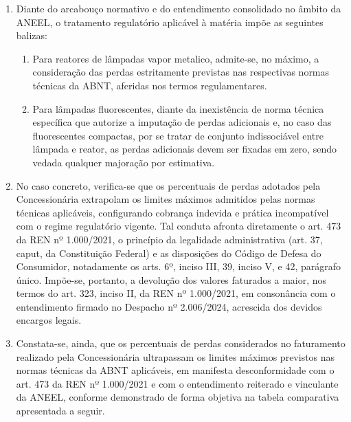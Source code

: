 \begin{enumerate}[resume]
{(iii) determinar que esta decisão seja cumprida no prazo de 15 (quinze) dias após o seu trânsito em julgado; e  

(iv) determinar que a distribuidora envie à ANEEL, num prazo máximo de 15 (quinze) dias após o prazo previsto no item

(viii) desta decisão, comprovação do seu cumprimento. (grifou-se)}

\item
Diante do arcabouço normativo e do entendimento consolidado no âmbito da ANEEL, o tratamento regulatório aplicável à matéria impõe as seguintes balizas: 

\begin{enumerate}
    \ifperdaVapor
    \item %
    Para reatores de lâmpadas vapor metalico, admite-se, no máximo, a consideração das perdas estritamente previstas nas respectivas normas técnicas da ABNT, aferidas nos termos regulamentares.
    \fi
    \ifperdaFluorescente
    \item %
    Para lâmpadas fluorescentes, diante da inexistência de norma técnica específica que autorize a imputação de perdas adicionais  e, no caso das fluorescentes compactas, por se tratar de conjunto indissociável entre lâmpada e reator, as perdas adicionais devem ser fixadas em zero, sendo vedada qualquer majoração por estimativa.
    \fi
\end{enumerate}

\ifperdaVapor
\item %
No caso concreto, verifica-se que os percentuais de perdas adotados pela Concessionária extrapolam os limites máximos admitidos pelas normas técnicas aplicáveis, configurando cobrança indevida e prática incompatível com o regime regulatório vigente. Tal conduta afronta diretamente o art. 473 da REN nº 1.000/2021, o princípio da legalidade administrativa (art. 37, caput, da Constituição Federal) e as disposições do Código de Defesa do Consumidor, notadamente os arts. 6º, inciso III, 39, inciso V, e 42, parágrafo único. Impõe-se, portanto, a devolução dos valores faturados a maior, nos termos do art. 323, inciso II, da REN nº 1.000/2021, em consonância com o entendimento firmado no Despacho nº 2.006/2024, acrescida dos devidos encargos legais. 

\item %
Constata-se, ainda, que os percentuais de perdas considerados no faturamento realizado pela Concessionária ultrapassam os limites máximos previstos nas normas técnicas da ABNT aplicáveis, em manifesta desconformidade com o art. 473 da REN nº 1.000/2021 e com o entendimento reiterado e vinculante da ANEEL, conforme demonstrado de forma objetiva na tabela comparativa apresentada a seguir. 


\end{enumerate}
